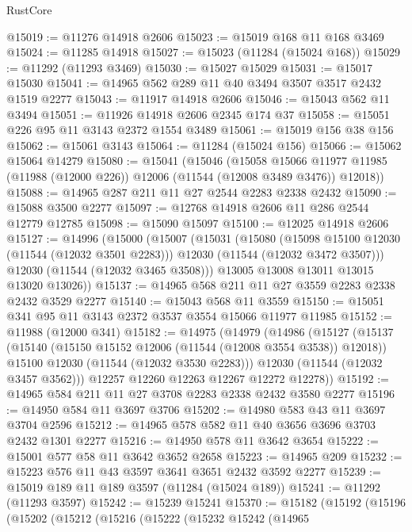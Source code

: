 \begin{lexlean}{RustCore}
\begin{coremodule}
@15019 := @11276 @14918 @2606
@15023 := @15019 @168 @11 @168 @3469
@15024 := @11285 @14918
@15027 := @15023 (@11284 (@15024 @168))
@15029 := @11292 (@11293 @3469)
@15030 := @15027 @15029
@15031 := @15017 @15030
@15041 := @14965 @562 @289 @11 @40 @3494 @3507 @3517 @2432 @1519 @2277
@15043 := @11917 @14918 @2606
@15046 := @15043 @562 @11 @3494
@15051 := @11926 @14918 @2606 @2345 @174 @37
@15058 := @15051 @226 @95 @11 @3143 @2372 @1554 @3489
@15061 := @15019 @156 @38 @156
@15062 := @15061 @3143
@15064 := @11284 (@15024 @156)
@15066 := @15062 @15064 @14279
@15080 := @15041
    (@15046
      (@15058
        @15066
        @11977
        @11985
        (@11988 (@12000 @226))
        @12006
        (@11544 (@12008 @3489 @3476))
        @12018))
@15088 := @14965 @287 @211 @11 @27 @2544 @2283 @2338 @2432
@15090 := @15088 @3500 @2277
@15097 := @12768 @14918 @2606 @11 @286 @2544 @12779 @12785
@15098 := @15090 @15097
@15100 := @12025 @14918 @2606
@15127 := @14996
    (@15000
      (@15007
        (@15031
          (@15080
            (@15098 @15100 @12030 (@11544 (@12032 @3501 @2283)))
            @12030
            (@11544 (@12032 @3472 @3507)))
          @12030
          (@11544 (@12032 @3465 @3508)))
        @13005
        @13008
        @13011
        @13015
        @13020
        @13026))
@15137 := @14965 @568 @211 @11 @27 @3559 @2283 @2338 @2432 @3529 @2277
@15140 := @15043 @568 @11 @3559
@15150 := @15051 @341 @95 @11 @3143 @2372 @3537 @3554 @15066 @11977 @11985
@15152 := @11988 (@12000 @341)
@15182 := @14975
    (@14979
      (@14986
        (@15127
          (@15137
            (@15140 (@15150 @15152 @12006 (@11544 (@12008 @3554 @3538)) @12018))
            @15100
            @12030
            (@11544 (@12032 @3530 @2283)))
          @12030
          (@11544 (@12032 @3457 @3562)))
        @12257
        @12260
        @12263
        @12267
        @12272
        @12278))
@15192 := @14965 @584 @211 @11 @27 @3708 @2283 @2338 @2432 @3580 @2277
@15196 := @14950 @584 @11 @3697 @3706
@15202 := @14980 @583 @43 @11 @3697 @3704 @2596
@15212 := @14965 @578 @582 @11 @40 @3656 @3696 @3703 @2432 @1301 @2277
@15216 := @14950 @578 @11 @3642 @3654
@15222 := @15001 @577 @58 @11 @3642 @3652 @2658
@15223 := @14965 @209
@15232 := @15223 @576 @11 @43 @3597 @3641 @3651 @2432 @3592 @2277
@15239 := @15019 @189 @11 @189 @3597 (@11284 (@15024 @189))
@15241 := @11292 (@11293 @3597)
@15242 := @15239 @15241
@15370 := @15182
    (@15192
      (@15196
        (@15202
          (@15212
            (@15216
              (@15222
                (@15232
                  @15242
                  (@14965

\end{coremodule}
\end{lexlean}
